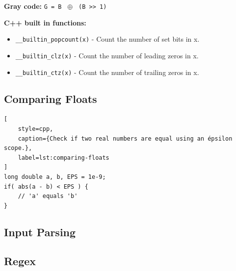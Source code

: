 \documentclass[letterpaper,landscape]{article}
\begin{document}
\noindent\textbf{Gray code:} \texttt{G = B } $\oplus$ \texttt{ (B >> 1)}\par\vspace{\baselineskip}

\noindent\textbf{C++ built in functions:}

\begin{itemize}
  \item \texttt{\_\_builtin\_popcount(x)} - Count the number of set bits in x.
  \item \texttt{\_\_builtin\_clz(x)} - Count the number of leading zeros in x.
  \item  \texttt{\_\_builtin\_ctz(x)} - Count the number of trailing zeros in x.
\end{itemize}

\subsection{Comparing Floats}

\begin{lstlisting}[
    style=cpp,
    caption={Check if two real numbers are equal using an épsilon scope.},
    label=lst:comparing-floats
]
long double a, b, EPS = 1e-9;
if( abs(a - b) < EPS ) {
    // 'a' equals 'b'
}
\end{lstlisting}

\subsection{Input Parsing}



\subsection{Regex}


\end{document}

